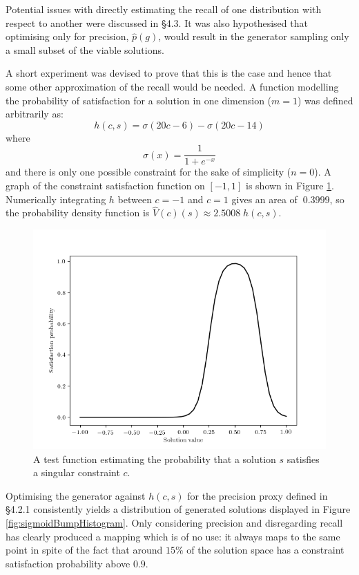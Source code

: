 \documentclass[../../main.tex]{subfiles}
\begin{document}
Potential issues with directly estimating the recall of one distribution with respect to another were discussed in \S4.3.
It was also hypothesised that optimising only for precision, $\hat{p}(g)$, would result in the generator sampling only a small subset of the viable solutions.

A short experiment was devised to prove that this is the case and hence that some other approximation of the recall would be needed.
A function modelling the probability of satisfaction for a solution in one dimension ($m=1$) was defined arbitrarily as:
$$h(c,s)=\sigma(20c-6)-\sigma(20c-14)$$
where
$$\sigma(x)=\frac{1}{1+e^{-x}}$$
and there is only one possible constraint for the sake of simplicity ($n=0$).
A graph of the constraint satisfaction function on $[-1, 1]$ is shown in Figure \ref{fig:sigmoidBumpFunction}.
Numerically integrating $h$ between $c=-1$ and $c=1$ gives an area of $~0.3999$, so the probability density function is $\hat{V}(c)(s)\approx2.5008\;h(c,s)$.
\begin{figure}[H]
    \begin{center}
    \includegraphics[width=\textwidth]{sigmoidBumpFunction}
    \caption{
        A test function estimating the probability that a solution $s$ satisfies a singular constraint $c$.
    }
    \label{fig:sigmoidBumpFunction}
    \end{center}
\end{figure}
Optimising the generator against $h(c,s)$ for the precision proxy defined in \S4.2.1 consistently yields a distribution of generated solutions displayed in Figure \ref{fig:sigmoidBumpHistogram}.
Only considering precision and disregarding recall has clearly produced a mapping which is of no use: it always maps to the same point in spite of the fact that around $15\%$ of the solution space has a constraint satisfaction probability above $0.9$.
\end{document}

